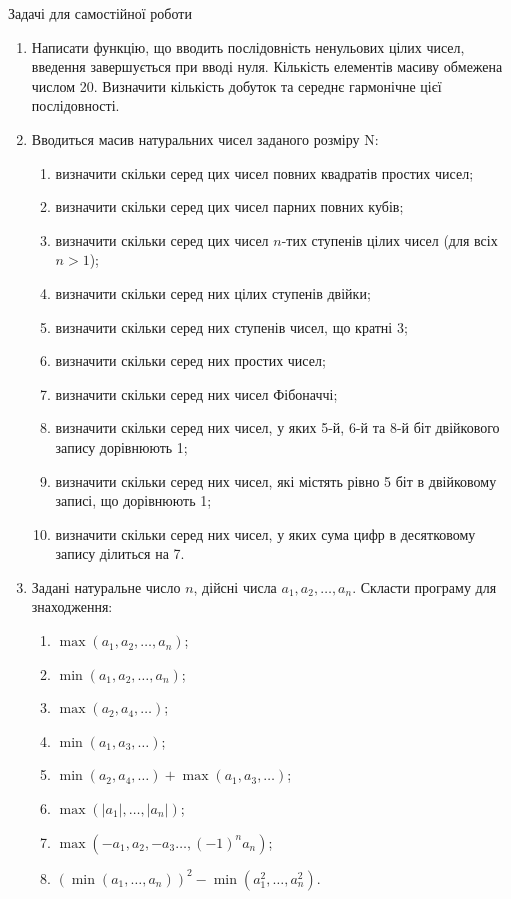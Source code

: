 \documentclass[]{article}
\makeatletter
\newcommand{\xslalph}[1]{\expandafter\@xslalph\csname c@#1\endcsname}
\newcommand{\@xslalph}[1]{%
    \ifcase#1\or а\or б\or в\or г\or д\or e\or є\or ж\or з\or i%
    \or й\or к\or л\or м\or н\or о\or п\or р\or с\or т%
    \or у\or ф\or х\or ц\or ч\or ш\or ю\or я\or аа\or бб\or вв%
    \else\@ctrerr\fi%
}
\makeatother
\begin{document}
Задачі для самостійної роботи

\begin{enumerate}
\def\labelenumi{\arabic{enumi})}
\setcounter{enumi}{6}
\item
  Написати функцію, що вводить послідовність ненульових цілих чисел,
  введення завершується при вводі нуля. Кількість елементів масиву
  обмежена числом 20. Визначити кількість добуток та середнє гармонічне
  цієї послідовності.
\item
  Вводиться масив натуральних чисел заданого розміру N:
\begin{enumerate}[label=\xslalph*)]
\item визначити скільки серед цих чисел повних квадратів простих чисел;
\item визначити скільки серед цих чисел парних повних кубів;
\item визначити скільки серед цих чисел $n$-тих ступенів цілих чисел (для
всіх $n>1$);
\item визначити скільки серед них цілих ступенів двійки;
\item визначити скільки серед них ступенів чисел, що кратні 3;
\item визначити скільки серед них простих чисел;
\item визначити скільки серед них чисел Фібоначчі;
\item визначити скільки серед них чисел, у яких 5-й, 6-й та 8-й біт
двійкового запису дорівнюють 1;
\item визначити скільки серед них чисел, які містять рівно 5 біт в
двійковому записі, що дорівнюють 1;
\item визначити скільки серед них чисел, у яких сума цифр в десятковому
запису ділиться на 7.
 \end{enumerate}

\item Задані натуральне число \(n\), дійсні числа
\(a_{1},a_{2},\ldots,a_{n}\). Скласти програму для знаходження:
\begin{enumerate}[label=\xslalph*)]
\item
 \(\max\left( a_{1},a_{2},\ldots,a_{n} \right)\); 
\item
\(\min\left( a_{1},a_{2},\ldots,a_{n} \right)\);
\item \(\max\left( a_{2},a_{4},\ldots \right)\); 
\item
\(\min\left( a_{1},a_{3},\ldots \right)\);
\item
\(\min\left( a_{2},a_{4},\ldots \right) + \max\left( a_{1},a_{3},\ldots \right)\);
\item
\(\max\left( \left| a_{1} \right|,\ldots,\left| a_{n} \right| \right)\);
\item \(\max\left( -a_{1},a_{2}, -a_{3}\ldots,(-1)^{n}a_{n} \right)\);
\item
\(\left( \min\left( a_{1},\ldots,a_{n} \right) \right)^{2} - \min\left( a_{1}^{2},\ldots,a_{n}^{2} \right)\).


\end{enumerate}
\end{enumerate}
\end{document}
